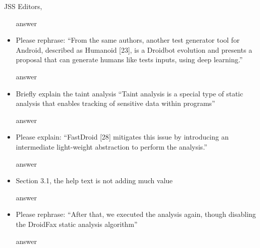 \documentclass{letter}
\begin{document}
\begin{letter}{JSS Editors,}
\begin{itemize}
{\color{blue}{\bf Answer:} answer}

\vspace{0.2cm}

\item Please rephrase:
``From the same authors, another test generator tool for Android, described as Humanoid [23], is a Droidbot evolution and
presents a proposal that can generate humans like tests inputs, using deep learning.''


\vspace{0.2cm}

{\color{blue}{\bf Answer:} answer}

\vspace{0.2cm}

\item Briefly explain the taint analysis
``Taint analysis is a special type of static analysis that enables tracking of sensitive data within programs''


\vspace{0.2cm}

{\color{blue}{\bf Answer:} answer}

\vspace{0.2cm}

\item Please explain:
``FastDroid [28] mitigates this issue by introducing an intermediate light-weight abstraction to perform the analysis.''


\vspace{0.2cm}

{\color{blue}{\bf Answer:} answer}

\vspace{0.2cm}

\item Section 3.1, the help text is not adding much value

\vspace{0.2cm}

{\color{blue}{\bf Answer:} answer}

\vspace{0.2cm}

\item Please rephrase: ``After that, we executed the analysis again, though disabling the DroidFax static analysis algorithm''

\vspace{0.2cm}

{\color{blue}{\bf Answer:} answer}

\vspace{0.2cm}


\end{itemize}
\end{letter}
\end{document}
